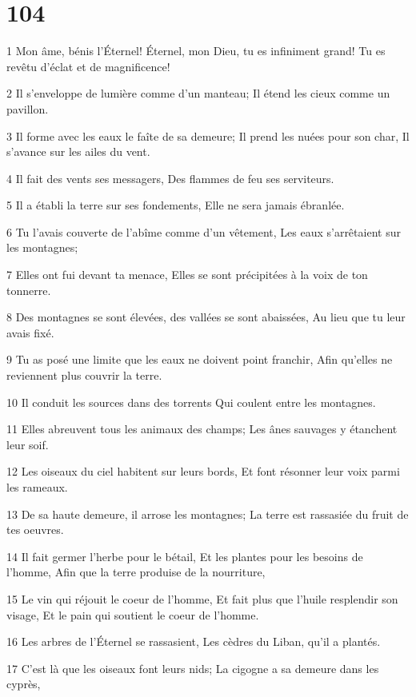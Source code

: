 \chapter{104}

\par 1 Mon âme, bénis l'Éternel! Éternel, mon Dieu, tu es infiniment grand! Tu es revêtu d'éclat et de magnificence!
\par 2 Il s'enveloppe de lumière comme d'un manteau; Il étend les cieux comme un pavillon.
\par 3 Il forme avec les eaux le faîte de sa demeure; Il prend les nuées pour son char, Il s'avance sur les ailes du vent.
\par 4 Il fait des vents ses messagers, Des flammes de feu ses serviteurs.
\par 5 Il a établi la terre sur ses fondements, Elle ne sera jamais ébranlée.
\par 6 Tu l'avais couverte de l'abîme comme d'un vêtement, Les eaux s'arrêtaient sur les montagnes;
\par 7 Elles ont fui devant ta menace, Elles se sont précipitées à la voix de ton tonnerre.
\par 8 Des montagnes se sont élevées, des vallées se sont abaissées, Au lieu que tu leur avais fixé.
\par 9 Tu as posé une limite que les eaux ne doivent point franchir, Afin qu'elles ne reviennent plus couvrir la terre.
\par 10 Il conduit les sources dans des torrents Qui coulent entre les montagnes.
\par 11 Elles abreuvent tous les animaux des champs; Les ânes sauvages y étanchent leur soif.
\par 12 Les oiseaux du ciel habitent sur leurs bords, Et font résonner leur voix parmi les rameaux.
\par 13 De sa haute demeure, il arrose les montagnes; La terre est rassasiée du fruit de tes oeuvres.
\par 14 Il fait germer l'herbe pour le bétail, Et les plantes pour les besoins de l'homme, Afin que la terre produise de la nourriture,
\par 15 Le vin qui réjouit le coeur de l'homme, Et fait plus que l'huile resplendir son visage, Et le pain qui soutient le coeur de l'homme.
\par 16 Les arbres de l'Éternel se rassasient, Les cèdres du Liban, qu'il a plantés.
\par 17 C'est là que les oiseaux font leurs nids; La cigogne a sa demeure dans les cyprès,
